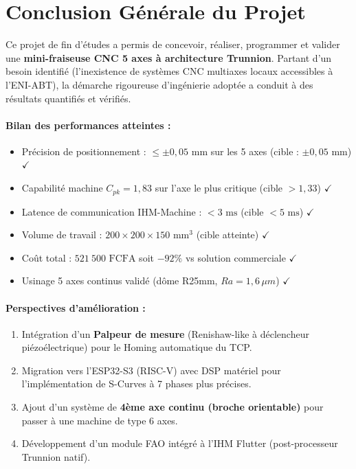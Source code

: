 \section{Conclusion Générale du Projet}

Ce projet de fin d'études a permis de concevoir, réaliser, programmer et valider une \textbf{mini-fraiseuse CNC 5 axes à architecture Trunnion}. Partant d'un besoin identifié (l'inexistence de systèmes CNC multiaxes locaux accessibles à l'ENI-ABT), la démarche rigoureuse d'ingénierie adoptée a conduit à des résultats quantifiés et vérifiés.

\paragraph{Bilan des performances atteintes :}
\begin{itemize}
    \item Précision de positionnement : $\leq \pm 0{,}05\text{ mm}$ sur les 5 axes (cible : $\pm 0{,}05\text{ mm}$) $\checkmark$
    \item Capabilité machine $C_{pk} = 1{,}83$ sur l'axe le plus critique (cible $> 1{,}33$) $\checkmark$
    \item Latence de communication IHM-Machine : $< 3\text{ ms}$ (cible $< 5\text{ ms}$) $\checkmark$
    \item Volume de travail : $200 \times 200 \times 150\text{ mm}^3$ (cible atteinte) $\checkmark$
    \item Coût total : $521~500\text{ FCFA}$ soit $-92\%$ vs solution commerciale $\checkmark$
    \item Usinage 5 axes continus validé (dôme R25mm, $Ra = 1{,}6\,\mu m$) $\checkmark$
\end{itemize}

\paragraph{Perspectives d'amélioration :}
\begin{enumerate}
    \item Intégration d'un \textbf{Palpeur de mesure} (Renishaw-like à déclencheur piézoélectrique) pour le Homing automatique du TCP.
    \item Migration vers l'ESP32-S3 (RISC-V) avec DSP matériel pour l'implémentation de S-Curves à 7 phases plus précises.
    \item Ajout d'un système de \textbf{4ème axe continu (broche orientable)} pour passer à une machine de type 6 axes.
    \item Développement d'un module FAO intégré à l'IHM Flutter (post-processeur Trunnion natif).
\end{enumerate}
